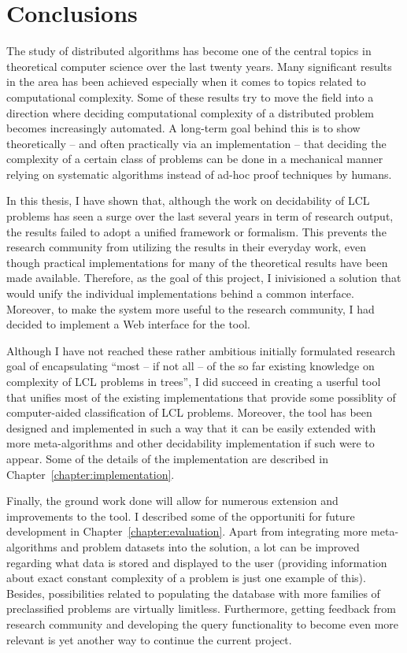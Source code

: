 \chapter{Conclusions}
\label{chapter:conclusions}

The study of distributed algorithms has become
one of the central topics in theoretical computer science
over the last twenty years. Many significant results in the area
has been achieved especially when it comes to topics related
to computational complexity. Some of these results
try to move the field into a direction where deciding
computational complexity of a distributed problem becomes
increasingly automated. A long-term goal behind this is
to show theoretically -- and often practically via an
implementation -- that deciding the complexity of a certain class
of problems can be done in a mechanical manner relying
on systematic algorithms instead of ad-hoc proof techniques
by humans.

In this thesis, I have shown that, although the work on
decidability of LCL problems has seen a surge over the last
several years in term of research output, the results
failed to adopt a unified framework or formalism. This
prevents the research community from utilizing the
results in their everyday work, even though practical
implementations for many of the theoretical results have been
made available. Therefore, as the goal of this project, I
inivisioned a solution that would unify the individual
implementations behind a common interface. Moreover, to make
the system more useful to the research community, I had decided
to implement a Web interface for the tool.

Although I have not reached these rather ambitious initially formulated
research goal of encapsulating ``most -- if not
all -- of
the so far existing knowledge on complexity of LCL
problems in trees'', I did succeed in creating a userful
tool that unifies most of the existing implementations that
provide some possiblity of computer-aided classification of LCL
problems. Moreover, the tool has been designed and implemented in
such a way that it can be easily extended with more meta-algorithms
and other decidability implementation if such were to appear.
Some of the details of the implementation are described
in Chapter~\ref{chapter:implementation}.

Finally, the ground work done will allow for numerous
extension and improvements to the tool. I described
some of the opportuniti for future development in
Chapter~\ref{chapter:evaluation}. Apart from
integrating more meta-algorithms and problem datasets into the
solution, a lot can be improved regarding what data
is stored and displayed to the user
(providing information about exact constant complexity of
a problem is just one example of this). Besides,
possibilities related to populating the database with more
families of preclassified problems are virtually limitless.
Furthermore, getting feedback from research community and
developing the query functionality to become even more
relevant is yet another way to continue the current
project.
